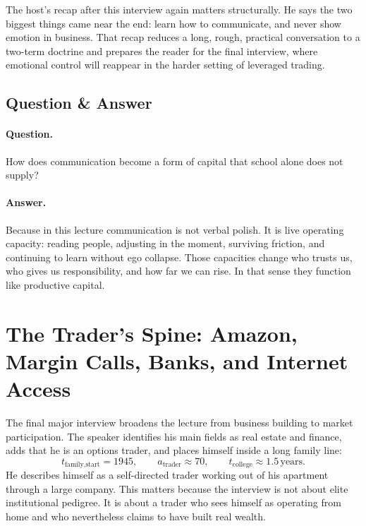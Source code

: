 The host's recap after this interview again matters structurally. He says the two biggest things came near the end: learn how to communicate, and never show emotion in business. That recap reduces a long, rough, practical conversation to a two-term doctrine and prepares the reader for the final interview, where emotional control will reappear in the harder setting of leveraged trading.

\subsection{Question \& Answer}

\paragraph{Question.} How does communication become a form of capital that school alone does not supply?

\paragraph{Answer.} Because in this lecture communication is not verbal polish. It is live operating capacity: reading people, adjusting in the moment, surviving friction, and continuing to learn without ego collapse. Those capacities change who trusts us, who gives us responsibility, and how far we can rise. In that sense they function like productive capital.

\section{The Trader's Spine: Amazon, Margin Calls, Banks, and Internet Access}

The final major interview broadens the lecture from business building to market participation. The speaker identifies his main fields as real estate and finance, adds that he is an options trader, and places himself inside a long family line:
\begin{equation}
t_{\text{family,start}} = 1945,
\qquad
a_{\text{trader}} \approx 70,
\qquad
t_{\text{college}} \approx 1.5\,\text{years}.
\end{equation}
He describes himself as a self-directed trader working out of his apartment through a large company. This matters because the interview is not about elite institutional pedigree. It is about a trader who sees himself as operating from home and who nevertheless claims to have built real wealth.

